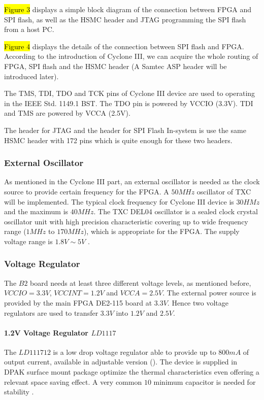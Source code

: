 \hl{Figure 3} displays a simple block diagram of the connection between FPGA and SPI flash, as well as the HSMC header and JTAG programming the SPI flash from a host PC.


\hl{Figure 4} displays the details of the connection between SPI flash and FPGA. According to the introduction of Cyclone III, we can acquire the whole routing of FPGA, SPI flash and the HSMC header (A Samtec ASP header will be introduced later).



The TMS, TDI, TDO and TCK pins of Cyclone III device are used to operating in the IEEE Std. 1149.1 BST. The TDO pin is powered by VCCIO (3.3V). TDI and TMS are powered by VCCA (2.5V).

The header for JTAG and the header for SPI Flash In-system is use the same HSMC header with 172 pins which is quite enough for these two headers.





\subsubsection{External Oscillator}

As mentioned in the Cyclone III part, an external oscillator is needed as the clock source to provide certain frequency for the FPGA. A $50MHz$ oscillator of TXC will be implemented. The typical clock frequency for Cyclone III device is $30HMz$ and the maximum is $40MHz$. The TXC DEL04 oscillator is a sealed clock crystal oscillator unit with high precision characteristic covering up to wide frequency range ($1MHz$ to $170 MHz$), which is appropriate for the FPGA. The supply voltage range is $1.8V \sim 5V$ \citep{TXC:osc_datasheet}.



\subsubsection{Voltage Regulator}

The $B2$ board needs at least three different voltage levels, as mentioned before, $VCCIO=3.3V$, $VCCINT= 1.2V$ and $VCCA=2.5V$. The external power source is provided by the main FPGA DE2-115 board at $3.3V$. Hence two voltage regulators are used to transfer $3.3V$ into $1.2V$ and $2.5V$.

\paragraph{1.2V Voltage Regulator $LD1117$}
The $LD111712$ is a low drop voltage regulator able to provide up to $800mA$ of output current, available in adjustable version (). The device is supplied in DPAK surface mount package optimize the thermal characteristics even offering a relevant space saving effect. A very common $10$ minimum capacitor is needed for stability \citep{STMicro:2012:LD1117xx}.

